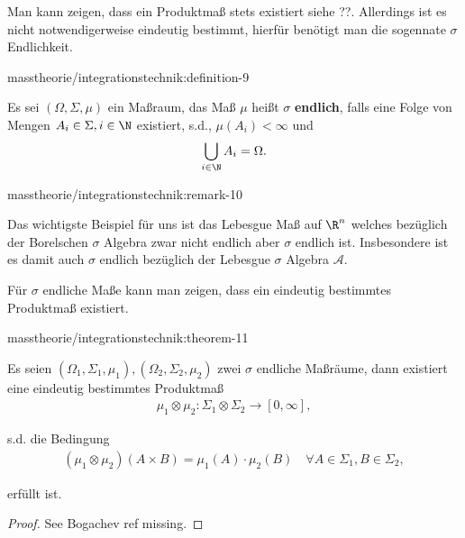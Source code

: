 \documentclass[letterpaper,10pt,german]{jupyterBook}
\begin{document}
\par
Man kann zeigen, dass ein Produktmaß stets existiert siehe ??. Allerdings ist es nicht notwendigerweise eindeutig bestimmt, hierfür benötigt man die sogennate \(\sigma\) Endlichkeit.
\begin{definition}{}{masstheorie/integrationstechnik:definition-9}



\par
Es sei \((\Omega,\Sigma,\mu)\) ein Maßraum, das Maß \(\mu\) heißt \(\sigma\)\textbf{ endlich}, falls eine Folge von Mengen \(A_i\in\Sigma,i\in\N\) existiert, s.d., \(\mu(A_i)<\infty\) und
\begin{align*}
\bigcup_{i\in\N} A_i = \Omega.
\end{align*}\end{definition}
\begin{remark}{}{masstheorie/integrationstechnik:remark-10}



\par
Das wichtigste Beispiel für uns ist das Lebesgue Maß auf \(\R^n\) welches bezüglich der Borelschen \(\sigma\) Algebra zwar nicht endlich aber \(\sigma\) endlich ist. Insbesondere ist es damit auch \(\sigma\) endlich bezüglich der Lebesgue \(\sigma\) Algebra \(\mathcal{A}\).
\end{remark}

\par
Für \(\sigma\) endliche Maße kann man zeigen, dass ein eindeutig bestimmtes Produktmaß existiert.
\begin{theorem}{}{masstheorie/integrationstechnik:theorem-11}



\par
Es seien \((\Omega_1,\Sigma_1,\mu_1), (\Omega_2,\Sigma_2,\mu_2)\) zwei \(\sigma\) endliche Maßräume, dann existiert eine eindeutig bestimmtes Produktmaß
\begin{align*}
\mu_1\otimes \mu_2:\Sigma_1\otimes\Sigma_2\to[0,\infty],
\end{align*}
\par
s.d. die Bedingung
\begin{align*}
(\mu_1\otimes\mu_2)(A\times B) = \mu_1(A)\cdot\mu_2(B)\quad\forall A\in\Sigma_1, B\in\Sigma_2,
\end{align*}
\par
erfüllt ist.
\end{theorem}

\begin{proof}
 See Bogachev ref missing.
\end{proof}
\end{document}
